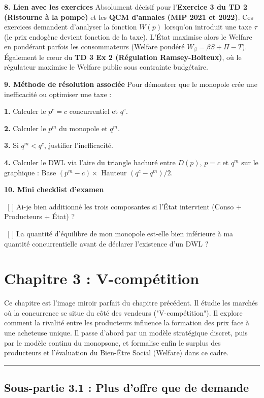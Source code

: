 \documentclass[11pt, a4paper]{report}
\begin{document}
\textbf{8. Lien avec les exercices}
Absolument décisif pour l'\textbf{Exercice 3 du TD 2 (Ristourne à la pompe)} et les \textbf{QCM d'annales (MIP 2021 et 2022)}. Ces exercices demandent d'analyser la fonction $W(p)$ lorsqu'on introduit une taxe $\tau$ (le prix endogène devient fonction de la taxe). L'État maximise alors le Welfare en pondérant parfois les consommateurs (Welfare pondéré $W_\beta = \beta S + \Pi - T$). Également le cœur du \textbf{TD 3 Ex 2 (Régulation Ramsey-Boiteux)}, où le régulateur maximise le Welfare public sous contrainte budgétaire.

\textbf{9. Méthode de résolution associée}
Pour démontrer que le monopole crée une inefficacité ou optimiser une taxe :
\par \textbf{1.} Calculer le $p^c = c$ concurrentiel et $q^c$.
\par \textbf{2.} Calculer le $p^m$ du monopole et $q^m$.
\par \textbf{3.} Si $q^m < q^c$, justifier l'inefficacité.
\par \textbf{4.} Calculer le DWL via l'aire du triangle hachuré entre $D(p)$, $p=c$ et $q^m$ sur le graphique : Base $(p^m - c) \times$ Hauteur $(q^c - q^m) / 2$. 

\textbf{10. Mini checklist d'examen}
\par \textbullet\ [ ] Ai-je bien additionné les trois composantes si l'État intervient (Conso + Producteurs + État) ?
\par \textbullet\ [ ] La quantité d'équilibre de mon monopole est-elle bien inférieure à ma quantité concurrentielle avant de déclarer l'existence d'un DWL ?
\newpage
\chapter{Chapitre 3 : V-compétition}

Ce chapitre est l'image miroir parfait du chapitre précédent. Il étudie les marchés où la concurrence se situe du côté des vendeurs ("V-compétition"). Il explore comment la rivalité entre les producteurs influence la formation des prix face à une acheteuse unique. Il passe d'abord par un modèle stratégique discret, puis par le modèle continu du monopsone, et formalise enfin le surplus des producteurs et l'évaluation du Bien-Être Social (Welfare) dans ce cadre.

\vspace{1cm}\hrule\vspace{1cm}

\section{Sous-partie 3.1 : Plus d'offre que de demande}
\end{document}
